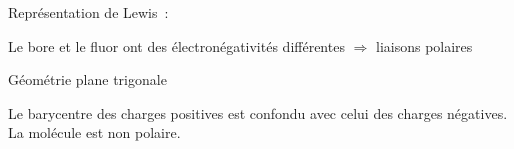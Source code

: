 Représentation de Lewis~:
\begin{center}
\end{center}

Le bore et le fluor ont des électronégativités différentes $\Rightarrow$
liaisons  polaires

Géométrie plane trigonale
\begin{center}
\end{center}

Le barycentre des charges positives est confondu avec celui des charges
négatives. La molécule est non polaire.

